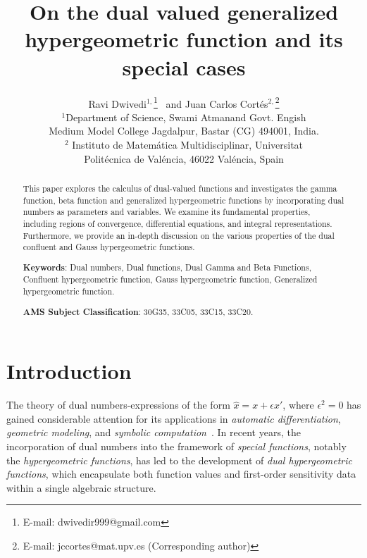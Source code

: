\documentclass[11pt,a4paper,fleqn]{article}
\numberwithin{equation}{section}
\numberwithin{lemma}{section}
\numberwithin{theorem}{section}
\numberwithin{corollary}{section}
\begin{document}
	\title{On the dual valued generalized hypergeometric function and its special cases}
	\author{Ravi Dwivedi$^{1,}$\footnote{E-mail: dwivedir999@gmail.com}  %
		\,
		 and Juan Carlos Cort\'es$^{2,}$\footnote{E-mail: jccortes@mat.upv.es (Corresponding author)}
		\\ ${}^{1}$Department of Science, Swami Atmanand Govt. Engish \\
		Medium Model College Jagdalpur, Bastar (CG) 494001, India.\\
	${}^{2}$ Instituto de Matem\'atica
	Multidisciplinar, Universitat\\
	Polit\'ecnica 
	de Val\'encia, 46022
	Val\'encia, Spain}
	\maketitle
	\begin{abstract}
This paper explores the calculus of dual-valued functions and investigates the gamma function, beta function and generalized hypergeometric functions by incorporating dual numbers as parameters and variables. We examine its fundamental properties, including regions of convergence, differential equations, and integral representations. %
Furthermore, we provide an in-depth discussion on the various properties of the dual confluent and Gauss hypergeometric functions.
 
		\medskip
		\noindent\textbf{Keywords}: Dual numbers, Dual functions, Dual Gamma and Beta Functions, Confluent hypergeometric function, Gauss hypergeometric function, Generalized hypergeometric function.
		
		\medskip
		\noindent\textbf{AMS Subject Classification}: 30G35, 33C05, 33C15, 33C20. 
	\end{abstract}
	
	\section{Introduction}\label{s:i}
	The theory of dual numbers-expressions of the form $\hat{x} = x + \epsilon x'$, where $\epsilon^2 = 0$ has gained considerable attention for its applications in \textit{automatic differentiation}, \textit{geometric modeling}, and \textit{symbolic computation}~\cite{gw, maclane1998categories, stitzinger1982dual}. In recent years, the incorporation of dual numbers into the framework of \textit{special functions}, notably the \textit{hypergeometric functions}, has led to the development of \textit{dual hypergeometric functions}, which encapsulate both function values and first-order sensitivity data within a single algebraic structure.
	
\end{document}
